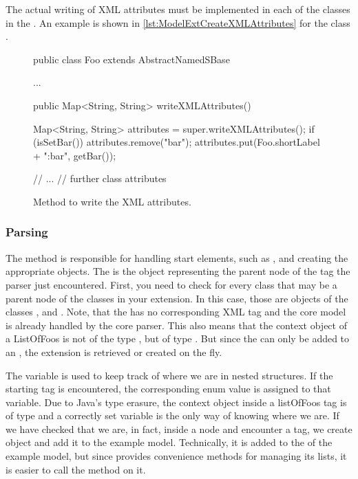 The actual writing of XML attributes must be implemented in each of the
classes in the .  An example is shown in 
\vref{lst:ModelExtCreateXMLAttributes} for the class .

\begin{figure}[htb]
  \begin{example}[numbers=left]
public class Foo extends AbstractNamedSBase {
  ...

  public Map<String, String> writeXMLAttributes() {
    Map<String, String> attributes = super.writeXMLAttributes();
    if (isSetBar()) {
      attributes.remove("bar");
      attributes.put(Foo.shortLabel + ":bar", getBar());
    }

    // ...
    // further class attributes
  }
}\end{example}
  \caption{Method to write the XML attributes.}
  \label{lst:ModelExtCreateXMLAttributes}
\end{figure}


\subsubsection{Parsing}

The  method is responsible for handling start
elements, such as , and creating the appropriate
objects.  The  is the object representing the parent
node of the tag the parser just encountered.  First, you need to check for
every class that may be a parent node of the classes in your extension.  In
this case, those are objects of the classes \Model,  and
.  Note, that the  has no corresponding XML
tag and the core model is already handled by the core parser.  This also
means that the context object of a ListOfFoos is not of the type
, but of type \Model.  But since the 
can only be added to an , the extension is retrieved or
created on the fly.

The  variable is used to keep track of where we are in
nested structures.  If the  starting tag is encountered,
the corresponding enum value is assigned to that variable.  Due to Java's
type erasure, the context object inside a listOfFoos tag is of type
 and a correctly set  variable is the only
way of knowing where we are.  If we have checked that we are, in fact,
inside a  node and encounter a  tag, we create
 object and add it to the example model.  Technically, it is
added to the  of the example model, but since
 provides convenience methods for managing its lists, it
is easier to call the  method on it.

